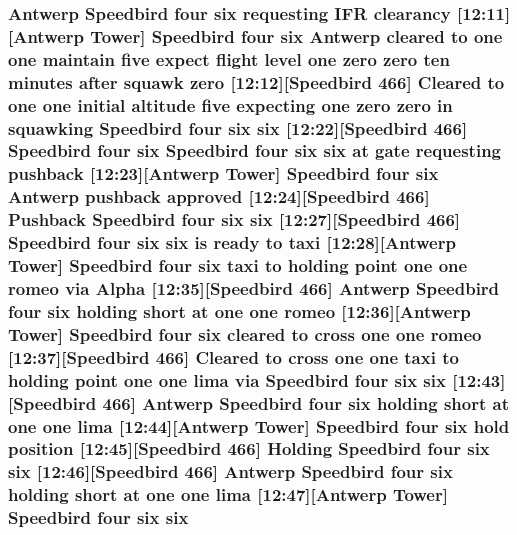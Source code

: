 \subsubsection[{\texorpdfstring{six}{six}}]{\setlength{\rightskip}{0pt plus 5cm}Antwerp Speedbird four six requesting I\+FR clearancy \mbox{[}12\+:11\mbox{]}\mbox{[}Antwerp {\bf Tower}\mbox{]} Speedbird four six Antwerp cleared to {\bf one} {\bf one} maintain five expect flight level {\bf one} {\bf zero} {\bf zero} {\bf ten} minutes after squawk {\bf zero} \mbox{[}12\+:12\mbox{]}\mbox{[}Speedbird 466\mbox{]} Cleared to {\bf one} {\bf one} initial altitude five expecting {\bf one} {\bf zero} {\bf zero} in {\bf squawking} Speedbird four six six \mbox{[}12\+:22\mbox{]}\mbox{[}Speedbird 466\mbox{]} Speedbird four six Speedbird four six six at gate requesting pushback \mbox{[}12\+:23\mbox{]}\mbox{[}Antwerp {\bf Tower}\mbox{]} Speedbird four six Antwerp pushback {\bf approved} \mbox{[}12\+:24\mbox{]}\mbox{[}Speedbird 466\mbox{]} Pushback Speedbird four six six \mbox{[}12\+:27\mbox{]}\mbox{[}Speedbird 466\mbox{]} Speedbird four six six is ready to taxi \mbox{[}12\+:28\mbox{]}\mbox{[}Antwerp {\bf Tower}\mbox{]} Speedbird four six taxi to holding point {\bf one} {\bf one} {\bf romeo} via {\bf Alpha} \mbox{[}12\+:35\mbox{]}\mbox{[}Speedbird 466\mbox{]} Antwerp Speedbird four six holding short at {\bf one} {\bf one} {\bf romeo} \mbox{[}12\+:36\mbox{]}\mbox{[}Antwerp {\bf Tower}\mbox{]} Speedbird four six cleared to cross {\bf one} {\bf one} {\bf romeo} \mbox{[}12\+:37\mbox{]}\mbox{[}Speedbird 466\mbox{]} Cleared to cross {\bf one} {\bf one} taxi to holding point {\bf one} {\bf one} {\bf lima} via Speedbird four six six \mbox{[}12\+:43\mbox{]}\mbox{[}Speedbird 466\mbox{]} Antwerp Speedbird four six holding short at {\bf one} {\bf one} {\bf lima} \mbox{[}12\+:44\mbox{]}\mbox{[}Antwerp {\bf Tower}\mbox{]} Speedbird four six hold {\bf position} \mbox{[}12\+:45\mbox{]}\mbox{[}Speedbird 466\mbox{]} Holding Speedbird four six six \mbox{[}12\+:46\mbox{]}\mbox{[}Speedbird 466\mbox{]} Antwerp Speedbird four six holding short at {\bf one} {\bf one} {\bf lima} \mbox{[}12\+:47\mbox{]}\mbox{[}Antwerp {\bf Tower}\mbox{]} Speedbird four six six}\hypertarget{happyDay4ATC_8txt_a3279acb4484698e3b3b90d6a4e9c0c32}{}\label{happyDay4ATC_8txt_a3279acb4484698e3b3b90d6a4e9c0c32}
